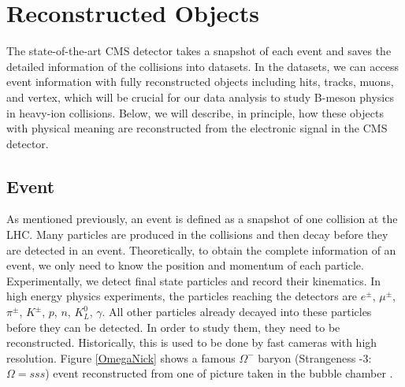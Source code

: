 \chapter{Reconstructed Objects}

The state-of-the-art CMS detector takes a snapshot of each event and saves the detailed information of the collisions into datasets. In the datasets, we can access event information with fully reconstructed objects including hits, tracks, muons, and vertex, which will be crucial for our data analysis to study B-meson physics in heavy-ion collisions. Below, we will describe, in principle, how these objects with physical meaning are reconstructed from the electronic signal in the CMS detector.

\section{Event}

As mentioned previously, an event is defined as a snapshot of one collision at the LHC. Many particles are produced in the collisions and then decay before they are detected in an event. Theoretically, to obtain the complete information of an event, we only need to know the position and momentum of each particle. Experimentally, we detect final state particles and record their kinematics. In high energy physics experiments, the particles reaching the detectors are $e^{\pm}$, $\mu^{\pm}$, $\pi^{\pm}$, $K^{\pm}$, $p$, $n$, $K^0_L$, $\gamma$. All other particles already decayed into these particles before they can be detected. In order to study them, they need to be reconstructed. Historically, this is used to be done by fast cameras with high resolution. Figure \ref{OmegaNick} shows a famous $\Omega^-$ baryon (Strangeness -3: $\Omega = sss$) event reconstructed from one of picture taken in the bubble chamber \cite{OmegaRef}.

